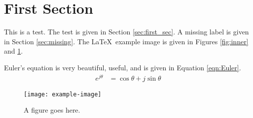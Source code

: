 \documentclass{article}
\begin{document}
\section{First Section\label{sec:first_sec}}
This is a test. 
The test is given in Section \ref{sec:first_sec}.
A missing label is given in Section \ref{sec:missing}.
The \LaTeX~example image is given in Figures \ref{fig:inner} and \ref{fig:outer}.

Euler's equation is very beautiful, useful, and is given in Equation \ref{eqn:Euler}.
\begin{align}
  e^{j\theta} &= \cos\theta+j\sin\theta \label{eqn:Euler}
\end{align}
\begin{figure}[b]
  \centering
  \texttt{[image: example-image]}
  \caption{A figure goes here.\label{fig:inner}}\label{fig:outer}
\end{figure}

\end{document}
